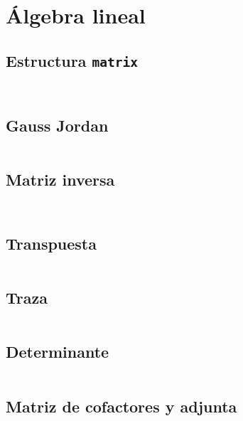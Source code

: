 \documentclass[11pt]{article}
\begin{document}
	\newpage
	\section{Álgebra lineal}
		\subsection{Estructura \texttt{matrix}}
		\inputminted[tabsize=2,breaklines,firstline=9,lastline=33,fontsize=\small]{c++}{matrix.cpp}
		\inputminted[tabsize=2,breaklines,firstline=122,lastline=227,fontsize=\small]{c++}{matrix.cpp}
		
		\subsection{Gauss Jordan}
		\inputminted[tabsize=2,breaklines,firstline=35,lastline=73,fontsize=\small]{c++}{matrix.cpp}
		
		\subsection{Matriz inversa}
		\inputminted[tabsize=2,breaklines,firstline=80,lastline=86,fontsize=\small]{c++}{matrix.cpp}
		\inputminted[tabsize=2,breaklines,firstline=260,lastline=281,fontsize=\small]{c++}{matrix.cpp}
		
		\subsection{Transpuesta}
		\inputminted[tabsize=2,breaklines,firstline=250,lastline=258,fontsize=\small]{c++}{matrix.cpp}
		
		\subsection{Traza}
		\inputminted[tabsize=2,breaklines,firstline=283,lastline=289,fontsize=\small]{c++}{matrix.cpp}
		
		\subsection{Determinante}
		\inputminted[tabsize=2,breaklines,firstline=291,lastline=307,fontsize=\small]{c++}{matrix.cpp}
		
		\subsection{Matriz de cofactores y adjunta}
		\inputminted[tabsize=2,breaklines,firstline=341,lastline=376,fontsize=\small]{c++}{matrix.cpp}
		
\end{document}
